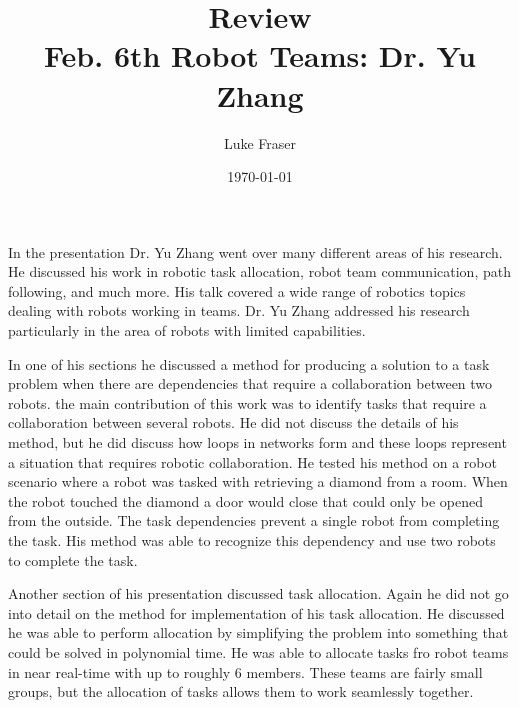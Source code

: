 \documentclass{article}
\begin{document}
\title{{\large Review} \\ Feb. 6th Robot Teams: Dr. Yu Zhang}
\author{Luke Fraser}
\date{\today}
\maketitle

\begingroup
\renewcommand{\section}[2]{}


\endgroup

\section*{Summary}
In the presentation Dr. Yu Zhang went over many different areas of his research. He discussed his work in robotic task allocation, robot team communication, path following, and much more.  His talk covered  a wide range of robotics topics dealing with robots working in teams. Dr. Yu Zhang addressed his research particularly in the area of robots with limited capabilities.

In one of his sections he discussed a method for producing a solution to a task problem when there are dependencies that require a collaboration between two robots. the main contribution of this work was to identify tasks that require a collaboration between several robots. He did not discuss the details of his method, but he did discuss how loops in networks form and these loops represent a situation that requires robotic collaboration. He tested his method on a robot scenario where a robot was tasked with retrieving a diamond from a room. When the robot touched the diamond a door would close that could only be opened from the outside. The task dependencies prevent a single robot from completing the task. His method was able to recognize this dependency and use two robots to complete the task.

Another section of his presentation discussed task allocation. Again he did not go into detail on the method for implementation of his task allocation. He discussed he was able to perform allocation by simplifying the problem into something that could be solved in polynomial time. He was able to allocate tasks fro robot teams in near real-time with up to roughly 6 members. These teams are fairly small groups, but the allocation of tasks allows them to work seamlessly together.
\end{document}
